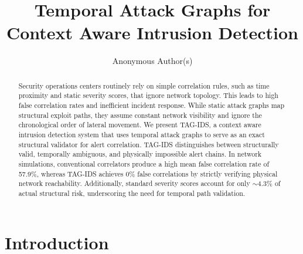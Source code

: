 \documentclass[runningheads]{llncs}
\begin{document}
\mainmatter              %
\setlength{\textfloatsep}{8pt plus 2pt minus 2pt}
\setlength{\floatsep}{8pt plus 2pt minus 2pt}
\setlength{\intextsep}{8pt plus 2pt minus 2pt}
%
\title{Temporal Attack Graphs for Context Aware Intrusion Detection}
%
%
\author{Anonymous Author(s)}


\maketitle              %

\begin{abstract}
Security operations centers routinely rely on simple correlation rules, such as time proximity and static severity scores, that ignore network topology. This leads to high false correlation rates and inefficient incident response. While static attack graphs map structural exploit paths, they assume constant network visibility and ignore the chronological order of lateral movement. We present TAG-IDS, a context aware intrusion detection system that uses temporal attack graphs to serve as an exact structural validator for alert correlation. TAG-IDS distinguishes between structurally valid, temporally ambiguous, and physically impossible alert chains. In network simulations, conventional correlators produce a high mean false correlation rate of 57.9\%, whereas TAG-IDS achieves 0\% false correlations by strictly verifying physical network reachability. Additionally, standard severity scores account for only $\sim$4.3\% of actual structural risk, underscoring the need for temporal path validation.

\end{abstract}
%
\section{Introduction}
\end{document}
